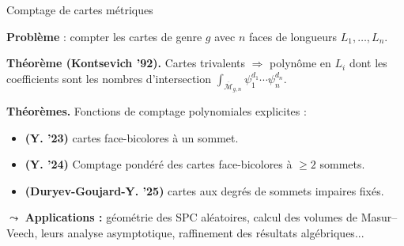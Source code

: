 \documentclass[11pt, aspectratio=149]{beamer}
\newcommand{\Mc}{\mathcal{M}}
\begin{document}
%
%
%

\begin{frame}{Comptage de cartes métriques}

\textbf{Problème} : compter les cartes de genre $g$ avec $n$ faces de longueurs $L_1,\ldots,L_n$.
\bigskip
\pause

\textbf{Théorème (Kontsevich '92).} Cartes \alert{trivalents} $\Rightarrow$ \alert{polynôme} en $L_i$ dont les coefficients sont les nombres d'intersection $\int_{\overline{\Mc}_{g,n}} \psi_1^{d_1}\cdots \psi_n^{d_n}$.
\bigskip
\pause

\textbf{Théorèmes.} Fonctions de comptage \alert{polynomiales} explicites :\\
\begin{itemize}
	\item \textbf{(Y. '23)} cartes \alert{face-bicolores à un sommet}.
	\item \textbf{(Y. '24)} Comptage pondéré des cartes \alert{face-bicolores à $\ge 2$ sommets}.
	\item \textbf{(Duryev-Goujard-Y. '25)} cartes aux \alert{degrés de sommets impaires fixés}.
\end{itemize}    
\bigskip

\pause
$\leadsto$ \textbf{Applications :} géométrie des SPC aléatoires, calcul des volumes de Masur--Veech, leurs analyse asymptotique, raffinement des résultats algébriques...
    
\end{frame}
\end{document}
